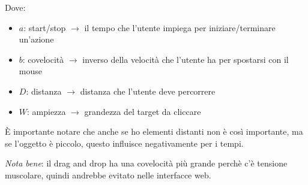 Dove:
\begin{itemize}

\item $a$: start/stop $\to$ il tempo che l'utente impiega per iniziare/terminare un'azione
\item $b$: covelocit\`a $\to$ inverso della velocit\`a che l'utente ha per spostarsi con il mouse
\item $D$: distanza $\to$ distanza che l'utente deve percorrere
\item $W$: ampiezza $\to$ grandezza del target da cliccare

\end{itemize}

\`E importante notare che anche se ho elementi distanti non \`e  cos\`i importante, ma se l'oggetto \`e piccolo, questo influisce negativamente per i tempi.

\textit{Nota bene}: il drag and drop ha una covelocit\`a pi\`u grande perch\`e c'\`e tensione muscolare, quindi andrebbe evitato nelle interfacce web.
